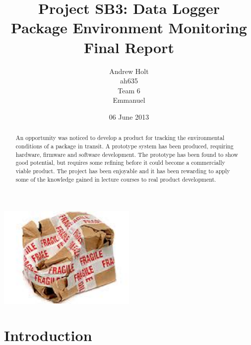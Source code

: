 \documentclass[a4paper,10pt]{article}  %
\title{Project SB3: Data Logger\\
       Package Environment Monitoring\\
       Final Report}
\author{Andrew Holt\\
        ah635\\
        Team 6\\
        Emmanuel}
\date{06 June 2013}
\begin{document}
\maketitle


\begin{center}
  \includegraphics[width=0.5\textwidth]{damaged_parcel.jpg}
\end{center}


\begin{abstract}
An opportunity was noticed to develop a product for tracking
the environmental conditions of a package in transit. A prototype
system has been produced, requiring hardware, firmware and software
development. The prototype has been found to show good potential, but
requires some refining before it could become a commercially viable
product. The project has been enjoyable and it has been rewarding to
apply some of the knowledge gained in lecture courses to real product
development.
\end{abstract}

\newpage

\tableofcontents
{}
\listoffigures
\listoftables

\newpage

\section{Introduction}
\label{sec:introduction}
\end{document}
